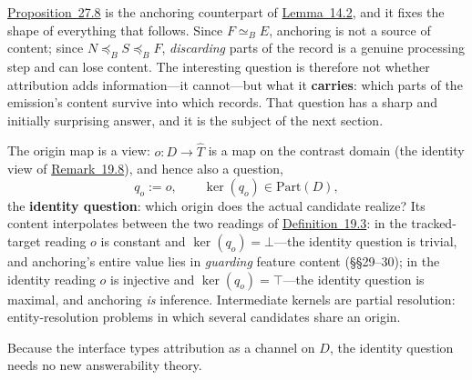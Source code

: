 \hyperlink{stmt:27.8}{Proposition~27.8} is the anchoring counterpart of \hyperlink{stmt:14.2}{Lemma~14.2}, and it fixes the shape of everything that follows. Since \(F \simeq_B E\), anchoring is not a source of content; since \(N \preceq_B S \preceq_B F\), \emph{discarding} parts of the record is a genuine processing step and can lose content. The interesting question is therefore not whether attribution adds information---\hspace{0pt}it cannot---\hspace{0pt}but what it \textbf{carries}: which parts of the emission's content survive into which records. That question has a sharp and initially surprising answer, and it is the subject of the next section.



The origin map is a view: \(o : D \to \widehat{T}\) is a map on the contrast domain (the identity view of \hyperlink{stmt:19.8}{Remark~19.8}), and hence also a question,
\[
q_o := o, \qquad \ker(q_o) \in \mathrm{Part}(D),
\]
the \textbf{identity question}: which origin does the actual candidate realize? Its content interpolates between the two readings of \hyperlink{stmt:19.3}{Definition~19.3}: in the tracked-target reading \(o\) is constant and \(\ker(q_o) = \bot\)---\hspace{0pt}the identity question is trivial, and anchoring's entire value lies in \emph{guarding} feature content (§§29--30); in the identity reading \(o\) is injective and \(\ker(q_o) = \top\)---\hspace{0pt}the identity question is maximal, and anchoring \emph{is} inference. Intermediate kernels are partial resolution: entity-resolution problems in which several candidates share an origin.

Because the interface types attribution as a channel on \(D\), the identity question needs no new answerability theory.

